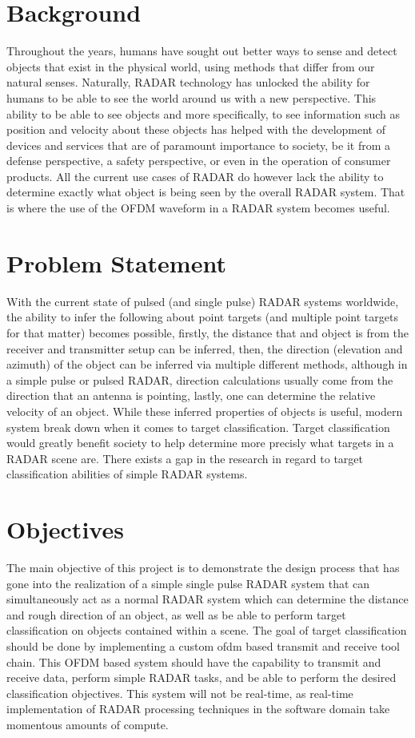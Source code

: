 \documentclass[11pt]{report}
\begin{document}
\section{Background}
Throughout the years, humans have sought out better ways to sense and detect objects that exist in the physical world, using methods that differ from our natural senses. Naturally, RADAR technology has unlocked the ability for humans to be able to see the world around us with a new perspective. This ability to be able to see objects and more specifically, to see information such as position and velocity about these objects has helped with the development of devices and services that are of paramount importance to society, be it from a defense perspective, a safety perspective, or even in the operation of consumer products. All the current use cases of RADAR do however lack the ability to determine exactly what object is being seen by the overall RADAR system. That is where the use of the OFDM waveform in a RADAR system becomes useful.



\section{Problem Statement}
With the current state of pulsed (and single pulse) RADAR systems worldwide, the ability to infer the following about point targets (and multiple point targets for that matter) becomes possible, firstly, the distance that and object is from the receiver and transmitter setup can be inferred, then, the direction (elevation and azimuth) of the object can be inferred via multiple different methods, although in a simple pulse or pulsed RADAR, direction calculations usually come from the direction that an antenna is pointing, lastly, one can determine the relative velocity of an object. While these inferred properties of objects is useful, modern system break down when it comes to target classification. Target classification would greatly benefit society to help determine more precisly what targets in a RADAR scene are. There exists a gap in the research in regard to target classification abilities of simple RADAR systems.


\section{Objectives}
The main objective of this project is to demonstrate the design process that has gone into the realization of a simple single pulse RADAR system that can simultaneously act as a normal RADAR system which can determine the distance and rough direction of an object, as well as be able to perform target classification on objects contained within a scene. The goal of target classification should be done by implementing a custom \gls{ofdm} based transmit and receive tool chain. This OFDM based system should have the capability to transmit and receive data, perform simple RADAR tasks, and be able to perform the desired classification objectives. This system will not be real-time, as real-time implementation of RADAR processing techniques in the software domain take momentous amounts of compute.
\end{document}
